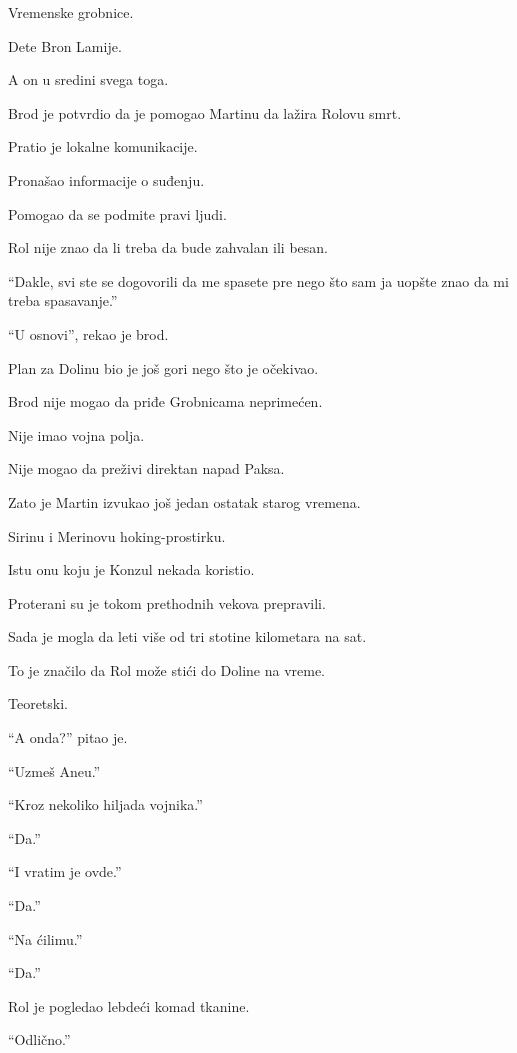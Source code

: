 Vremenske grobnice.

Dete Bron Lamije.

A on u sredini svega toga.

\bigskip

Brod je potvrdio da je pomogao Martinu da lažira Rolovu smrt.

Pratio je lokalne komunikacije.

Pronašao informacije o suđenju.

Pomogao da se podmite pravi ljudi.

\bigskip

Rol nije znao da li treba da bude zahvalan ili besan.

``Dakle, svi ste se dogovorili da me spasete pre nego što sam ja uopšte znao da mi treba spasavanje.''

``U osnovi'', rekao je brod.

\bigskip

Plan za Dolinu bio je još gori nego što je očekivao.

Brod nije mogao da priđe Grobnicama neprimećen.

Nije imao vojna polja.

Nije mogao da preživi direktan napad Paksa.

Zato je Martin izvukao još jedan ostatak starog vremena.

Sirinu i Merinovu hoking-prostirku.

Istu onu koju je Konzul nekada koristio.

\bigskip

Proterani su je tokom prethodnih vekova prepravili.

Sada je mogla da leti više od tri stotine kilometara na sat.

To je značilo da Rol može stići do Doline na vreme.

Teoretski.

\bigskip

``A onda?'' pitao je.

``Uzmeš Aneu.''

``Kroz nekoliko hiljada vojnika.''

``Da.''

``I vratim je ovde.''

``Da.''

``Na ćilimu.''

``Da.''

Rol je pogledao lebdeći komad tkanine.

``Odlično.''

\bigskip


